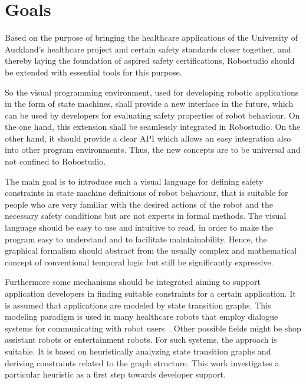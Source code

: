 \chapter{Goals}
\label{chap:goals}


Based on the purpose of bringing the healthcare applications of the University of Auckland's healthcare project and certain safety standards closer together, and the\-re\-by laying the foundation of aspired safety certifications, Robostudio should be extended with essential tools for this purpose.

So the visual programming environment, used for developing robotic applications in the form of state machines, shall provide a new interface in the future, which can be used by developers for evaluating safety properties of robot behaviour. On the one hand, this extension shall be seamlessly integrated in Robostudio. On the other hand, it should provide a clear API which allows an easy integration also into other program environments. Thus, the new concepts are to be universal and not confined to Robostudio.

The main goal is to introduce such a visual language for defining safety constraints in state machine definitions of robot behaviour, that is suitable for people who are very familiar with the desired actions of the robot and the necessary safety conditions but are not experts in formal methods. The visual language should be easy to use and intuitive to read, in order to make the program easy to understand and to facilitate maintainability.
Hence, the graphical formalism should abstract from the usually complex and mathematical concept of conventional temporal logic but still be significantly expressive.
 
Furthermore some mechanisms should be integrated aiming to support application developers in finding suitable constraints for a certain application. It is assumed that applications are modeled by state transition graphs. This modeling paradigm is used in many healthcare robots that employ dialogue systems for communicating with robot users~\cite{Bickmore2006}. Other possible fields might be shop assistant robots or entertainment robots. For such systems, the approach is suitable. It is based on heuristically analyzing state transition graphs and deriving constraints related to the graph structure. This work investigates a particular heuristic as a first step towards developer support. 

